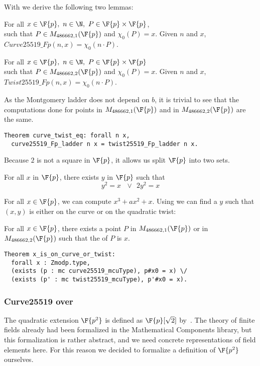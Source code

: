With  we derive the following two lemmas:
\begin{lemma}
For all $x \in \F{p},\ n \in \N,\ P \in \F{p} \times \F{p}$,\\
such that $P \in M_{486662,1}(\F{p})$ and $\chi_0(P) = x$.
Given $n$ and $x$, $Curve25519\_Fp(n,x) = \chi_0(n \cdot P)$.
\end{lemma}
\begin{lemma}
For all $x \in \F{p},\ n \in \N,\ P \in \F{p} \times \F{p}$\\
such that $P \in M_{486662,2}(\F{p})$ and $\chi_0(P) = x$.
Given $n$ and $x$, $Twist25519\_Fp(n,x) = \chi_0(n \cdot P)$.
\end{lemma}
As the Montgomery ladder does not depend on $b$, it is trivial to
see that the computations done for points in $M_{486662,1}(\F{p})$ and in
$M_{486662,2}(\F{p})$ are the same.
\begin{lstlisting}[language=Coq]
Theorem curve_twist_eq: forall n x,
  curve25519_Fp_ladder n x = twist25519_Fp_ladder n x.
\end{lstlisting}

Because $2$ is not a square in $\F{p}$, it allows us split $\F{p}$ into two sets.
\begin{lemma}
  \label{lemma:square-or-2square}
  For all $x$ in $\F{p}$, there exists $y$ in $\F{p}$ such that
  $$y^2 = x\ \ \ \lor\ \ 2y^2 = x$$
\end{lemma}
For all $x \in \F{p}$, we can compute $x^3 + ax^2 + x$. Using 
we can find a $y$ such that $(x,y)$ is either on the curve or on the quadratic twist:
\begin{lemma}
  \label{lemma:curve-or-twist}
  For all $x \in \F{p}$, there exists a point $P$ in $M_{486662,1}(\F{p})$ or
  in $M_{486662,2}(\F{p})$ such that the \xcoord of $P$ is $x$.
\end{lemma}
\begin{lstlisting}[language=Coq]
Theorem x_is_on_curve_or_twist:
  forall x : Zmodp.type,
  (exists (p : mc curve25519_mcuType), p#x0 = x) \/
  (exists (p' : mc twist25519_mcuType), p'#x0 = x).
\end{lstlisting}

\subsubsection{Curve25519 over }

The quadratic extension $\F{p^2}$ is defined as $\F{p}[\sqrt{2}]$ by~\cite{Ber06}.
The theory of finite fields already had been formalized in the Mathematical Components
library,
but this formalization is rather abstract, and we need concrete representations of field
elements here.
For this reason we decided to formalize a definition of $\F{p^2}$ ourselves.

